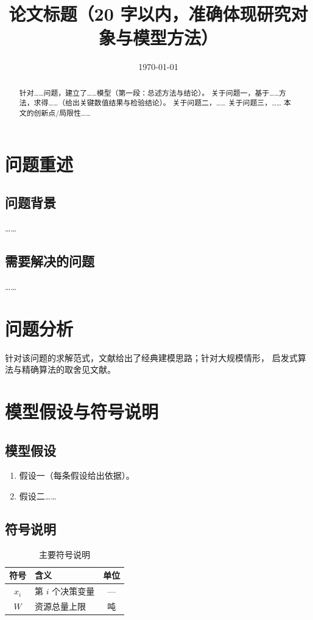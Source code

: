 \documentclass[withoutpreface,bwprint]{cumcmthesis}
\begin{document}
\title{论文标题（20 字以内，准确体现研究对象与模型方法）}
\date{\today}

\begin{abstract}
针对……问题，建立了……模型（第一段：总述方法与结论）。
关于问题一，基于……方法，求得……（给出关键数值结果与检验结论）。
关于问题二，……
关于问题三，……
本文的创新点/局限性……
\end{abstract}

\tableofcontents

\section{问题重述}
\subsection{问题背景}
……
\subsection{需要解决的问题}
……

\section{问题分析}
针对该问题的求解范式，文献\cite{ref1}给出了经典建模思路；针对大规模情形，
启发式算法与精确算法的取舍见文献\cite{ref2}。

\section{模型假设与符号说明}
\subsection{模型假设}
\begin{enumerate}
  \item 假设一（每条假设给出依据）。
  \item 假设二……
\end{enumerate}
\subsection{符号说明}
\begin{table}[htbp]
\centering
\caption{主要符号说明}
\begin{tabular}{clc}
\toprule
符号 & 含义 & 单位 \\
\midrule
$x_i$ & 第 $i$ 个决策变量 & --- \\
$W$   & 资源总量上限 & 吨 \\
\bottomrule
\end{tabular}
\end{table}
\end{document}
